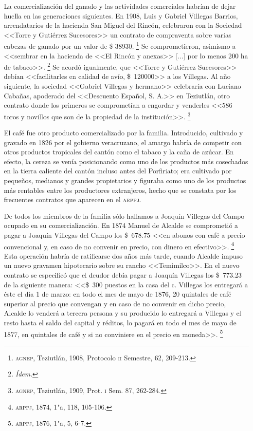 \documentclass[14pt,twoside,final]{extbook} %
\let\oldfootnote\footnote
\renewcommand\footnote[1]{%
\oldfootnote{\hspace{1mm}#1}}
\begin{document}
La comercialización del ganado y las actividades comerciales habrían de dejar huella en las generaciones siguientes. En 1908, Luis y Gabriel Villegas Barrios, arrendatarios de la hacienda San Miguel del Rincón, celebraron con la Sociedad <<Torre y Gutiérrez Sucesores>> un contrato de compraventa sobre varias cabezas de ganado por un valor de \$ 38930.\footnote{\textsc{agnep}, Teziutlán, 1908, Protocolo \textsc{ii} Semestre, 62, 209-213.} Se comprometieron, asimismo a <<sembrar en la hacienda de <<El Rincón y anexas>> [...] por lo menos 200 ha de tabaco>>.\footnote{\em Ídem.} Se acordó igualmente, que <<Torre y Gutiérrez Sucesores>> debían <<facilitarles en calidad de avío, \$~120000>> a los Villegas. Al año siguiente, la sociedad <<Gabriel Villegas y
hermano>> celebraría con Luciano Cabañas, apoderado del <<Descuento Español, S. A.>> en Teziutlán, otro contrato donde los primeros se comprometían a engordar y venderles <<586 toros y novillos que son de la propiedad de la institución>>.\footnote{\textsc{agnep}, Teziutlán, 1909, Prot. \textsc{i} Sem. 87, 262-284.}

El café fue otro producto comercializado por la familia. Introducido, cultivado y gravado en 1826 por el gobierno veracruzano, el amargo habría de competir con otros productos tropicales del cantón como el tabaco y la caña de azúcar. En efecto, la cereza se venía posicionando como uno de los productos más cosechados en la tierra caliente del cantón incluso antes del Porfiriato; era cultivado por pequeños, medianos y grandes propietarios y figuraba como uno de los productos más rentables entre los productores extranjeros, hecho que se constata por los frecuentes contratos que aparecen en el
\textsc{arppj}.

De todos los miembros de la familia sólo hallamos a Joaquín Villegas del Campo ocupado en su comercialización. En 1874 Manuel de Alcalde se comprometió a pagar a Joaquín Villegas del Campo los \$~678.75 <<en abonos con café a precio convencional y, en caso de no convenir en precio, con dinero en efectivo>>.\footnote{\textsc{arppj}, 1874, 1"a, 118, 105-106.} Esta operación habría de ratificarse dos años más tarde, cuando Alcalde impuso un nuevo gravamen hipotecario sobre su rancho <<Temimilco>>. En el nuevo contrato se especificó que el deudor debía pagar a Joaquín Villegas los \$~773.23 de la siguiente manera: <<\$~300 puestos en la casa del c. Villegas los entregará a éste el día 1 de marzo: en todo el mes de mayo de 1876, 20 quintales de café superior al precio que convengan y en caso de no convenir en dicho precio, Alcalde lo venderá a tercera persona y su producido lo entregará a Villegas y el resto hasta el saldo del capital y réditos, lo pagará en todo el mes de mayo de 1877, en quintales de café y si no conviniere en el precio en moneda>>.\footnote{\textsc{arppj}, 1876, 1"a, 5, 6-7.}
\end{document}
